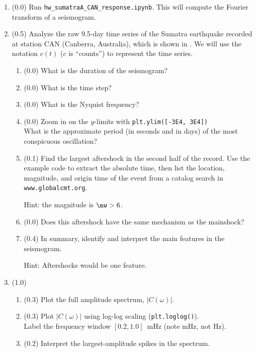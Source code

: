 \documentclass[11pt,titlepage,fleqn]{article}
\newcommand{\tfileresponse}{{\tt hw\_sumatraA\_CAN\_response.ipynb}}
\begin{document}
\begin{enumerate}

\item (0.0) Run \tfileresponse. This will compute the Fourier transform of a seismogram.




\item (0.5) Analyze the raw 9.5-day time series of the Sumatra earthquake recorded at station CAN (Canberra, Australia), which is shown in . We will use the notation $c(t)$ ($c$ is ``counts'') to represent the time series.

\begin{enumerate}
\item (0.0) What is the duration of the seismogram?
\item (0.0) What is the time step?
\item (0.0) What is the Nyquist frequency?
\item (0.0) Zoom in on the $y$-limits with \verb+plt.ylim([-3E4, 3E4])+ \\
What is the approximate period (in seconds and in days) of the most conspicuous oscillation?
\item (0.1) Find the largest aftershock in the second half of the record. Use the example code to extract the absolute time, then list the location, magnitude, and origin time of the event from a catalog search in \verb+www.globalcmt.org+.

Hint: the magnitude is $\mw > 6$.

\item (0.0) Does this aftershock have the same mechanism as the mainshock?
\item (0.4) In summary, identify and interpret the main features in the seismogram.

Hint: Aftershocks would be one feature.
\end{enumerate}


\item (1.0)
\begin{enumerate}
\item (0.3) Plot the full amplitude spectrum, $|C(\omega)|$.
\item (0.3) Plot $|C(\omega)|$ using log-log scaling (\verb+plt.loglog()+). \\
Label the frequency window $[0.2,1.0]$~mHz (note mHz, not Hz).
\item (0.2) Interpret the largest-amplitude spikes in the spectrum.


\end{enumerate}
\end{enumerate}
\end{document}
